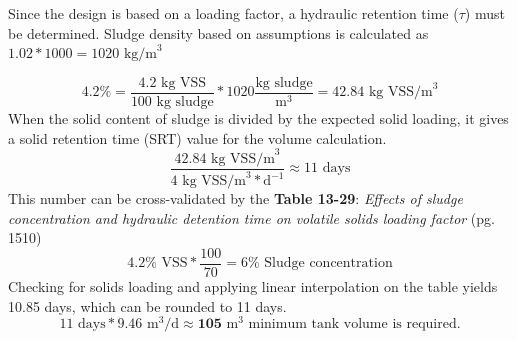 \documentclass[a4paper]{article}
\begin{document}
\section{}
\begin{minipage}[c]{0.6\textwidth}
Since the design is based on a loading factor, a hydraulic retention time ($\tau$) must be determined. Sludge density based on assumptions is calculated as $1.02*1000=1020\text{ kg/m}^3$
\end{minipage}
\hfill
\begin{minipage}{0.3\textwidth}
\end{minipage}
$$4.2\% = \frac{4.2\text{ kg VSS}}{100\text{ kg sludge}}*1020\frac{\text{kg sludge}}{\text{m}^3}=42.84\text{ kg VSS/m}^3$$
When the solid content of sludge is divided by the expected solid loading, it gives a solid retention time (SRT) value for the volume calculation.
$$\frac{42.84\text{ kg VSS/m}^3}{4\text{ kg VSS/m}^3*\text{d}^{-1}}\approx11\text{ days}$$
This number can be cross-validated by the \textbf{Table 13-29}: \textit{Effects of sludge concentration and hydraulic detention time on volatile solids loading factor} (pg. 1510)\autocite{metcalf2014}
$$4.2\%\text{ VSS}*\frac{100}{70}=6\%\text{ Sludge concentration}$$
Checking for solids loading and applying linear interpolation on the table yields 10.85 days, which can be rounded to 11 days.
$$11\text{ days}*9.46\text{ m}^3/\text{d}\approx\textbf{105}\text{ m}^3\text{ minimum tank volume is required.}$$
\newpage
\printbibliography
\end{document}
